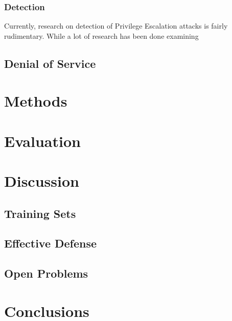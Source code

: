 \documentclass{acm_proc_article-sp}
\begin{document}
     \subsubsection{Detection}
     Currently, research on detection of Privilege Escalation attacks is fairly rudimentary. While a lot of research has been done examining  
    \subsection{Denial of Service}

\section{Methods}

\section{Evaluation}

\section{Discussion}
    \subsection{Training Sets}
    \subsection{Effective Defense}
    \subsection{Open Problems}

\section{Conclusions}

	

{}  %
\nocite{*}
%
%
\balancecolumns
\end{document}
